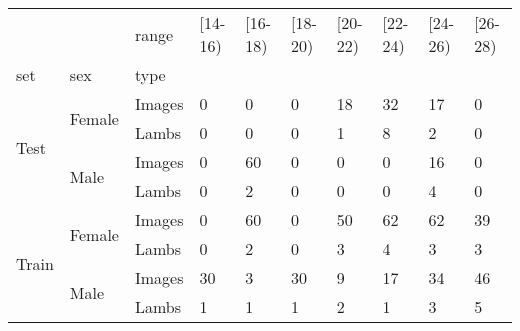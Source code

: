 \begin{tabular}{llllllllll}
\toprule
 &  & range & [14-16) & [16-18) & [18-20) & [20-22) & [22-24) & [24-26) & [26-28) \\
set & sex & type &  &  &  &  &  &  &  \\
\midrule
\multirow[t]{4}{*}{Test} & \multirow[t]{2}{*}{Female} & Images & 0 & 0 & 0 & 18 & 32 & 17 & 0 \\
 &  & Lambs & 0 & 0 & 0 & 1 & 8 & 2 & 0 \\
\cline{2-10}
 & \multirow[t]{2}{*}{Male} & Images & 0 & 60 & 0 & 0 & 0 & 16 & 0 \\
 &  & Lambs & 0 & 2 & 0 & 0 & 0 & 4 & 0 \\
\cline{1-10} \cline{2-10}
\multirow[t]{4}{*}{Train} & \multirow[t]{2}{*}{Female} & Images & 0 & 60 & 0 & 50 & 62 & 62 & 39 \\
 &  & Lambs & 0 & 2 & 0 & 3 & 4 & 3 & 3 \\
\cline{2-10}
 & \multirow[t]{2}{*}{Male} & Images & 30 & 3 & 30 & 9 & 17 & 34 & 46 \\
 &  & Lambs & 1 & 1 & 1 & 2 & 1 & 3 & 5 \\
\cline{1-10} \cline{2-10}
\bottomrule
\end{tabular}
